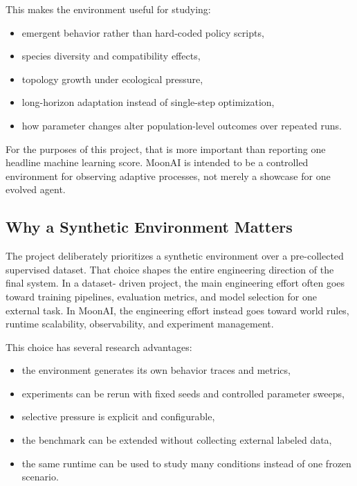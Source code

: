 This makes the environment useful for studying:

\begin{itemize}[nosep]
  \item emergent behavior rather than hard-coded policy scripts,
  \item species diversity and compatibility effects,
  \item topology growth under ecological pressure,
  \item long-horizon adaptation instead of single-step optimization,
  \item how parameter changes alter population-level outcomes over repeated runs.
\end{itemize}

For the purposes of this project, that is more important than reporting one headline machine
learning score. MoonAI is intended to be a controlled environment for observing adaptive
processes, not merely a showcase for one evolved agent.

\subsection{Why a Synthetic Environment Matters}

The project deliberately prioritizes a synthetic environment over a pre-collected supervised
dataset. That choice shapes the entire engineering direction of the final system. In a dataset-
driven project, the main engineering effort often goes toward training pipelines, evaluation
metrics, and model selection for one external task. In MoonAI, the engineering effort instead
goes toward world rules, runtime scalability, observability, and experiment management.

This choice has several research advantages:

\begin{itemize}[nosep]
  \item the environment generates its own behavior traces and metrics,
  \item experiments can be rerun with fixed seeds and controlled parameter sweeps,
  \item selective pressure is explicit and configurable,
  \item the benchmark can be extended without collecting external labeled data,
  \item the same runtime can be used to study many conditions instead of one frozen scenario.
\end{itemize}

